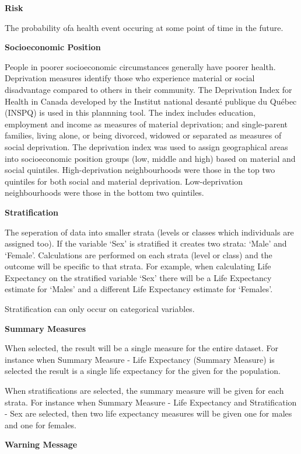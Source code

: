 \documentclass[]{book}
\begin{document}
\textbf{Risk}

The probability ofa health event occuring at some point of time in the
future.

\textbf{Socioeconomic Position}

People in poorer socioeconomic circumstances generally have poorer
health. Deprivation measures identify those who experience material or
social disadvantage compared to others in their community. The
Deprivation Index for Health in Canada developed by the Institut
national desanté publique du Québec (INSPQ)\citep{INSPQ2000} is used in
this plannning tool. The index includes education, employment and income
as measures of material deprivation; and single-parent families, living
alone, or being divorced, widowed or separated as measures of social
deprivation. The deprivation index was used to assign geographical areas
into socioeconomic position groups (low, middle and high) based on
material and social quintiles. High-deprivation neighbourhoods were
those in the top two quintiles for both social and material deprivation.
Low-deprivation neighbourhoods were those in the bottom two quintiles.

\textbf{Stratification}

The seperation of data into smaller strata (levels or
classes which individuals are assigned too). If the variable `Sex' is
stratified it creates two strata: `Male' and `Female'. Calculations are
performed on each strata (level or class) and the outcome will be
specific to that strata. For example, when calculating Life Expectancy
on the stratified variable `Sex' there will be a Life Expectancy
estimate for `Males' and a different Life Expectancy estimate for
`Females'.

Stratification can only occur on categorical variables.

\textbf{Summary Measures}

When selected, the result will be a single measure for
the entire dataset. For instance when Summary Measure - Life Expectancy
(Summary Measure) is selected the result is a single life expectancy for
the given for the population.

When stratifications are selected, the summary
measure will be given for each strata. For instance when Summary Measure
- Life Expectancy and Stratification - Sex are selected, then two life
expectancy measures will be given one for males and one for females.

\textbf{Warning Message}
\end{document}

